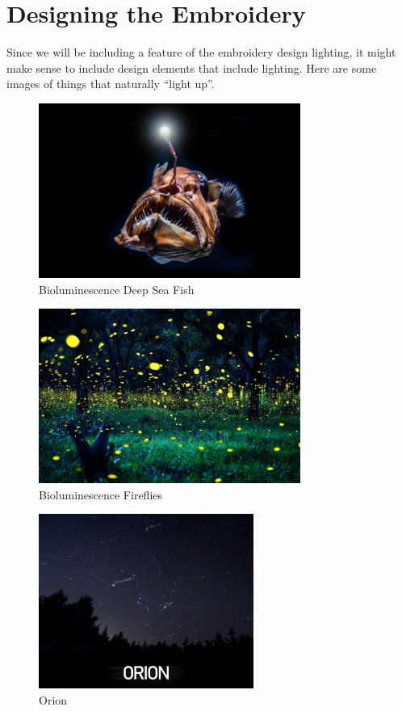 \documentclass[letterpaper,twoside,12pt]{article}
\begin{document}
\part{Designing the Embroidery}
Since we will be including a feature of the embroidery design lighting, it 
might make sense to include design elements that include lighting.  Here are 
some images of things that naturally ``light up''. 
\begin{figure}[hbpt]\begin{centering}%
\includegraphics[height=2.25in]{Bioluminescence-Deep-Sea-Fish-777x518.jpg}
\caption{Bioluminescence Deep Sea Fish}
\label{fig:biolumfish}
\end{centering}\end{figure}
\begin{figure}[hbpt]\begin{centering}%
\includegraphics[height=2.25in]{Bioluminescence-Fireflies-777x518.jpg}
\caption{Bioluminescence Fireflies}
\label{fig:biolumflies}
\end{centering}\end{figure}
\clearpage 
\begin{figure}[hbpt]\begin{centering}%
\includegraphics[height=2.25in]{orion.jpg}
\caption{Orion}
\label{fig:orion}
\end{centering}\end{figure}
\end{document}
